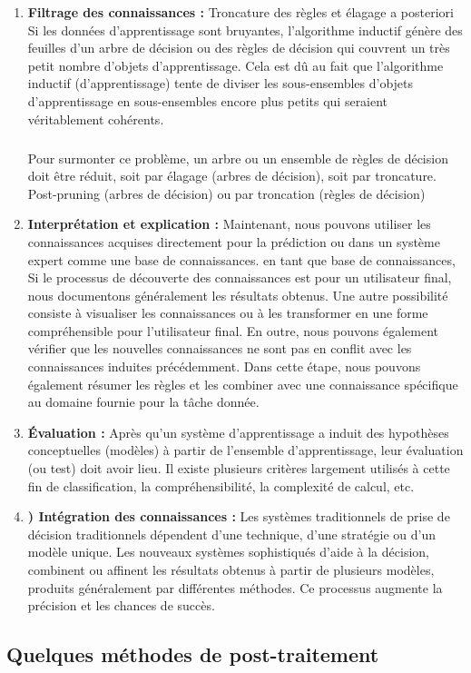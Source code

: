 \documentclass[a4paper, 12pt]{article}
\begin{document}
	\begin{enumerate}
		\item \textbf{Filtrage des connaissances : } Troncature des règles et élagage a posteriori
		Si les données d'apprentissage sont bruyantes, l'algorithme inductif génère des feuilles d'un arbre de décision ou des règles de décision qui couvrent un très petit nombre d'objets d'apprentissage. Cela est dû au fait que l'algorithme inductif (d'apprentissage) tente de diviser les sous-ensembles d'objets d'apprentissage en sous-ensembles encore plus petits qui seraient véritablement cohérents.  
		\subparagraph{} Pour surmonter ce problème, un arbre ou un ensemble de règles de décision doit être réduit, soit par élagage (arbres de décision), soit par troncature.
		Post-pruning (arbres de décision) ou par troncation (règles de décision)
		\item \textbf{Interprétation et explication :} Maintenant, nous pouvons utiliser les connaissances acquises directement pour la prédiction ou dans un système expert comme une base de connaissances.
		en tant que base de connaissances, Si le processus de découverte des connaissances est pour un utilisateur final, nous documentons généralement les résultats obtenus. Une autre possibilité consiste à visualiser les connaissances ou à les transformer en une forme compréhensible pour l'utilisateur final. En outre, nous pouvons également vérifier que les nouvelles connaissances ne sont pas en conflit avec les connaissances induites précédemment. Dans cette étape, nous pouvons également résumer les règles et les combiner avec une connaissance spécifique au domaine fournie pour la tâche donnée.
		\item \textbf{Évaluation :} Après qu'un système d'apprentissage a induit des hypothèses conceptuelles (modèles) à partir de l'ensemble d'apprentissage, leur évaluation (ou test) doit avoir lieu. Il existe plusieurs critères largement utilisés à cette fin de classification, la compréhensibilité, la complexité de calcul, etc.
		\item \textbf{) Intégration des connaissances :} Les systèmes traditionnels de prise de décision traditionnels dépendent d'une technique, d'une stratégie ou d'un modèle unique. Les nouveaux systèmes sophistiqués d'aide à la décision, combinent ou affinent les résultats obtenus à partir de plusieurs modèles, produits généralement par différentes méthodes. Ce processus augmente la précision et les chances de succès.
	\end{enumerate}
	\subsection{Quelques méthodes de post-traitement}
\end{document}
